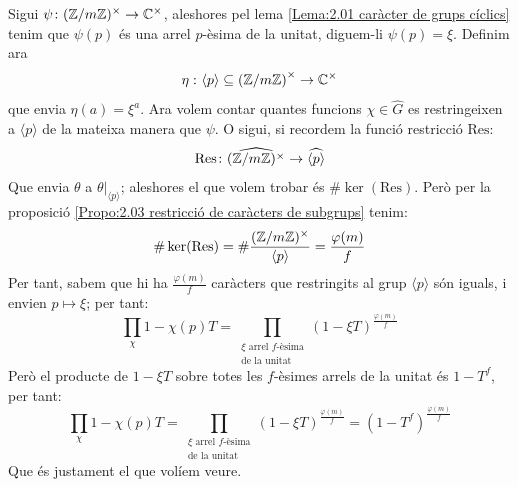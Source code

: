 \begin{pf}
    Sigui $\psi\colon(\mathbb Z/m\mathbb Z)^{\times}\to\mathbb C^{\times}$, aleshores pel lema \ref{Lema:2.01 caràcter de grups cíclics} tenim que $\psi(p)$ és una arrel $p$-èsima de la 
    unitat, diguem-li $\psi(p)=\xi$. Definim ara
    \[
    \eta\,\colon\langle p\rangle\subseteq\left(\mathbb Z/m\mathbb Z\right)^{\times}\to\mathbb C^\times
    \]
    que envia $\eta(a)=\xi^a$. Ara volem contar quantes funcions $\chi\in\widehat{G}$ es restringeixen a $\langle p\rangle$ de la mateixa manera que $\psi$. O sigui,
    si recordem la funció restricció $\mathrm{Res}$:
    \[
    \mathrm{Res}\colon \widehat{(\mathbb Z/m\mathbb Z)^{\times}}\to\widehat{\langle p\rangle}
    \]
    Que envia $\theta$ a $\theta|_{\langle p\rangle}$; aleshores el que volem trobar és $\#\ker(\mathrm{Res})$. Però per la proposició \ref{Propo:2.03 restricció de caràcters de subgrups} tenim:
    \[
    \#\ker(\mathrm{Res})=\#\frac{(\mathbb Z/m\mathbb Z)^\times}{\langle p\rangle}=\frac{\varphi(m)}{f}
    \]
    Per tant, sabem que hi ha $\frac{\varphi(m)}{f}$ caràcters que restringits al grup $\langle p\rangle$ són iguals, i envien $p\mapsto\xi$; per tant:
    \[
    \prod_\chi1-\chi(p)T=\prod_{\substack{\xi\text{ arrel $f$-èsima}\\\text{de la unitat}}}(1-\xi T)^\frac{\varphi(m)}{f}
    \]
    Però el producte de $1-\xi T$ sobre totes les $f$-èsimes arrels de la unitat és $1-T^f$, per tant:
    \[
    \prod_\chi1-\chi(p)T=\prod_{\substack{\xi\text{ arrel $f$-èsima}\\\text{de la unitat}}}(1-\xi T)^\frac{\varphi(m)}{f}=(1-T^f)^\frac{\varphi(m)}{f}
    \]
    Que és justament el que volíem veure.
\end{pf}

